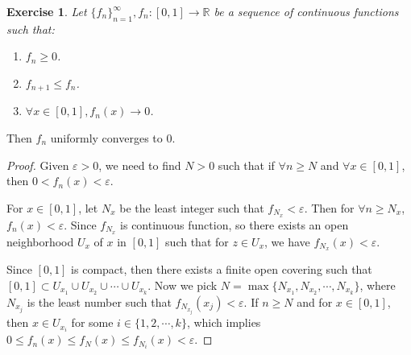 \documentclass[12pt,leqno]{amsart}
\newtheorem{exercise}{Exercise}[section]
\theoremstyle{definition}
\numberwithin{equation}{subsection}
\begin{document}
\begin{exercise}
Let $\{f_n\}^\infty_{n=1}, f_n:[0,1]\to\mathbb{R}$ be a sequence of continuous functions such that:
\begin{enumerate}
    \item $f_n \geq 0$.
    \item $f_{n+1}\leq f_n$.
    \item $\forall x\in [0,1], f_n(x)\to 0$.
\end{enumerate}
\end{exercise}
Then $f_n$ uniformly converges to $0$.
\begin{proof}
Given $\varepsilon > 0$, we need to find $N > 0$ such that if $\forall n \geq N$ and $\forall x\in [0,1]$, then $0 < f_n(x) < \varepsilon$.

For $x\in [0,1]$, let $N_x$ be the least integer such that $f_{N_x} < \varepsilon$. Then for $\forall n \geq N_x$, $f_n(x) < \varepsilon$. Since $f_{N_x}$ is continuous function, so there exists an open neighborhood $U_x$ of $x$ in $[0,1]$ such that for $z\in U_x$, we have $f_{N_x}(x) < \varepsilon$. 

Since $[0,1]$ is compact, then there exists a finite open covering such that $[0,1]\subset U_{x_1}\cup U_{x_2} \cup \cdots \cup U_{x_k}$. Now we pick $N = \max\{N_{x_1},N_{x_2},\cdots,N_{x_k}\}$, where $N_{x_j}$ is the least number such that $f_{N_{x_j}}(x_j) < \varepsilon$. If $n\geq N$ and for $x\in[0,1]$, then $x\in U_{x_i}$ for some $i\in\{1,2,\cdots, k\}$, which implies $0 \leq f_n(x) \leq f_N(x) \leq f_{N_i}(x) < \varepsilon$.
\end{proof}
\end{document}
